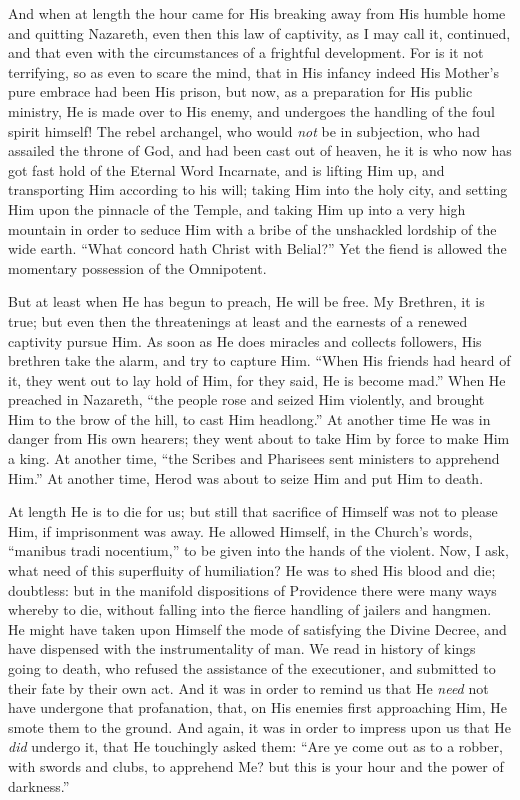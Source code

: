 And when at length the hour came for His breaking away
from His humble home and quitting Nazareth, even then
this law of captivity, as I may call it, continued, and
that even with the circumstances of a frightful
development. For is it not terrifying, so as even to
scare the mind, that in His infancy indeed His Mother's
pure embrace had been His prison, but now, as a
preparation for His public ministry, He is made over to
His enemy, and undergoes the handling of the foul spirit himself! The rebel archangel, who would \emph{not} be in
subjection, who had assailed the throne of God, and had
been cast out of heaven, he it is who now has got fast
hold of the Eternal Word Incarnate, and is lifting Him
up, and transporting Him according to his will; taking
Him into the holy city, and setting Him upon the pinnacle
of the Temple, and taking Him up into a very high
mountain in order to seduce Him with a bribe of the
unshackled lordship of the wide earth. ``What concord
hath Christ with Belial?'' Yet the fiend is allowed
the momentary possession of the Omnipotent.

But at least when He has begun to preach, He will be
free. My Brethren, it is true; but even then the
threatenings at least and the earnests of a renewed
captivity pursue Him. As soon as He does miracles and
collects followers, His brethren take the alarm, and try
to capture Him. ``When His friends had heard of it,
they went out to lay hold of Him, for they said, He is
become mad.'' When He preached in Nazareth, ``the
people rose and seized Him violently, and brought Him to
the brow of the hill, to cast Him headlong.'' At
another time He was in danger from His own hearers; they
went about to take Him by force to make Him a king. At
another time, ``the Scribes and Pharisees sent
ministers to apprehend Him.'' At another time, Herod
was about to seize Him and put Him to death.

At length He is to die for us; but still that
sacrifice of Himself was not to please Him, if
imprisonment was away. He allowed Himself, in the
Church's words, ``manibus tradi nocentium,'' to
be given into the hands of the violent. Now, I ask, what
need of this superfluity of humiliation? He was to shed
His blood and die; doubtless: but in the manifold
dispositions of Providence there were many ways whereby
to die, without falling into the fierce handling of
jailers and hangmen. He might have taken upon Himself the
mode of satisfying the Divine Decree, and have dispensed
with the instrumentality of man. We read in history of
kings going to death, who refused the assistance of the
executioner, and submitted to their fate by their own
act. And it was in order to remind us that He \emph{need} not
have undergone that profanation, that, on His enemies
first approaching Him, He smote them to the ground. And
again, it was in order to impress upon us that He \emph{did}
undergo it, that He touchingly asked them: ``Are ye
come out as to a robber, with swords and clubs, to
apprehend Me? but this is your hour and the power of
darkness.''

